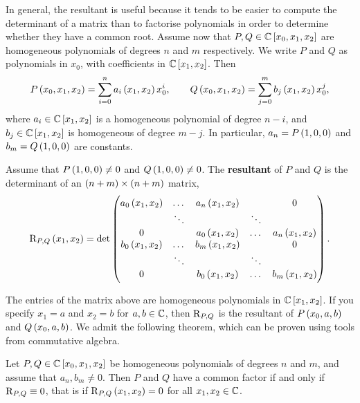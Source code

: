 
In general, the resultant is useful because it tends to be easier to compute the determinant of a matrix than to factorise polynomials in order to determine whether they have a common root. Assume now that $ P, Q \in \CC\sbr{x_0, x_1, x_2} $ are homogeneous polynomials of degrees $ n $ and $ m $ respectively. We write $ P $ and $ Q $ as polynomials in $ x_0 $, with coefficients in $ \CC\sbr{x_1, x_2} $. Then
$$ P\br{x_0, x_1, x_2} = \sum_{i = 0}^n a_i\br{x_1, x_2}x_0^i, \qquad Q\br{x_0, x_1, x_2} = \sum_{j = 0}^m b_j\br{x_1, x_2}x_0^j, $$
where $ a_i \in \CC\sbr{x_1, x_2} $ is a homogeneous polynomial of degree $ n - i $, and $ b_j \in \CC\sbr{x_1, x_2} $ is homogeneous of degree $ m - j $. In particular, $ a_n = P\br{1, 0, 0} $ and $ b_m = Q\br{1, 0, 0} $ are constants.

\begin{definition}
\label{def:9.5}
Assume that $ P\br{1, 0, 0} \ne 0 $ and $ Q\br{1, 0, 0} \ne 0 $. The \textbf{resultant} of $ P $ and $ Q $ is the determinant of an $ \br{n + m} \times \br{n + m} $ matrix,
$$ \R_{P, Q}\br{x_1, x_2} = \det
\begin{pmatrix}
a_0\br{x_1, x_2} & \dots & a_n\br{x_1, x_2} & & 0 \\
& \ddots & & \ddots & \\
0 & & a_0\br{x_1, x_2} & \dots & a_n\br{x_1, x_2} \\
b_0\br{x_1, x_2} & \dots & b_m\br{x_1, x_2} & & 0 \\
& \ddots & & \ddots & \\
0 & & b_0\br{x_1, x_2} & \dots & b_m\br{x_1, x_2}
\end{pmatrix}.
$$
\end{definition}

The entries of the matrix above are homogeneous polynomials in $ \CC\sbr{x_1, x_2} $. If you specify $ x_1 = a $ and $ x_2 = b $ for $ a, b \in \mathbb{C} $, then $ \mathrm{R}_{P, Q} $ is the resultant of $ P\br{x_0, a, b} $ and $ Q\br{x_0, a, b} $. We admit the following theorem, which can be proven using tools from commutative algebra.

\begin{theorem}
\label{thm:9.6}
Let $ P, Q \in \CC\sbr{x_0, x_1, x_2} $ be homogeneous polynomials of degrees $ n $ and $ m $, and assume that $ a_n, b_m \ne 0 $. Then $ P $ and $ Q $ have a common factor if and only if $ \mathrm{R}_{P, Q} \equiv 0 $, that is if $ \R_{P, Q}\br{x_1, x_2} = 0 $ for all $ x_1, x_2 \in \mathbb{C} $.
\end{theorem}

